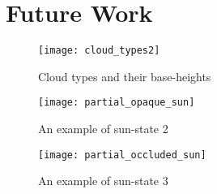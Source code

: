 \chapter{Future Work}

\begin{figure}[h!]
\caption{Cloud types and their base-heights}
\label{fig:img_fail3}
\texttt{[image: cloud\_types2]}
\centering
\end{figure}

\begin{figure}[h!]
\caption{An example of sun-state 2}
\label{fig:img_fail3}
\texttt{[image: partial\_opaque\_sun]}
\centering
\end{figure}


\begin{figure}[h!]
\caption{An example of sun-state 3}
\label{fig:img_fail3}
\texttt{[image: partial\_occluded\_sun]}
\centering
\end{figure}

